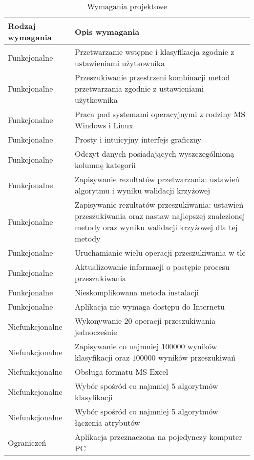\documentclass[../thesis.tex]{subfiles}
\begin{document}
\begin{table}[h]
\begin{center}
\begin{tabular}{ l | p{110mm} }
Rodzaj wymagania & Opis wymagania \\ \hline
Funkcjonalne & Przetwarzanie wstępne i klasyfikacja zgodnie z ustawieniami użytkownika \\ 
Funkcjonalne & Przeszukiwanie przestrzeni kombinacji metod przetwarzania zgodnie z ustawieniami użytkownika \\
Funkcjonalne & Praca pod systemami operacyjnymi z rodziny MS Windows i Linux \\
Funkcjonalne & Prosty i intuicyjny interfejs graficzny \\ 
Funkcjonalne & Odczyt danych posiadających wyszczególnioną kolumnę kategorii \\ 
Funkcjonalne & Zapisywanie rezultatów przetwarzania: ustawień algorytmu i wyniku walidacji krzyżowej \\
Funkcjonalne & Zapisywanie rezultatów przeszukiwania: ustawień przeszukiwania oraz nastaw najlepszej znalezionej metody oraz wyniku walidacji krzyżowej dla tej metody \\ 
Funkcjonalne & Uruchamianie wielu operacji przeszukiwania w tle \\ 
Funkcjonalne & Aktualizowanie informacji o postępie procesu przeszukiwania \\
Funkcjonalne & Nieskomplikowana metoda instalacji \\
Funkcjonalne & Aplikacja nie wymaga dostępu do Internetu \\
Niefunkcjonalne & Wykonywanie 20 operacji przeszukiwania jednocześnie \\
Niefunkcjonalne & Zapisywanie co najmniej $100000$ wyników klasyfikacji oraz $100000$ wyników przeszukiwań \\
Niefunkcjonalne & Obsługa formatu MS Excel \\
Niefunkcjonalne & Wybór spośród co najmniej 5 algorytmów klasyfikacji \\ 
Niefunkcjonalne & Wybór spośród co najmniej 5 algorytmów łączenia atrybutów \\ 
Ograniczeń & Aplikacja przeznaczona na pojedynczy komputer PC 
\end{tabular}
\caption{Wymagania projektowe}
\label{req:table}
\end{center}
\end{table}
\end{document}
